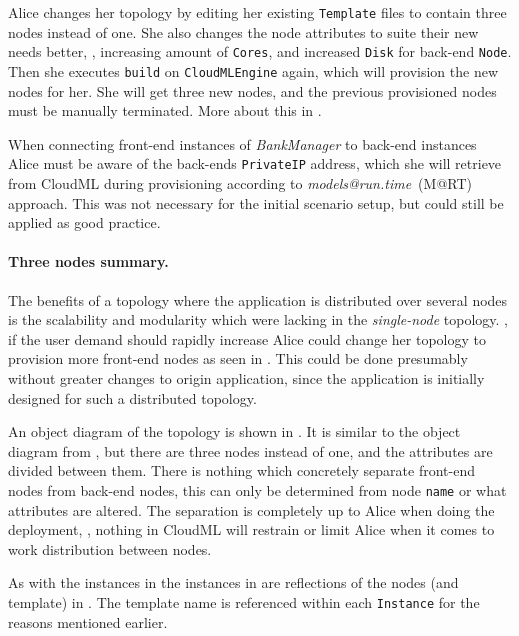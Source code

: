 Alice changes her topology by editing her existing \texttt{Template} files 
to contain three nodes instead of one. 
She also changes the node attributes to suite their new needs better,
\ie, increasing amount of \texttt{Cores}, and increased \texttt{Disk} for back-end \texttt{Node}.
Then she executes \texttt{build} on \texttt{CloudMLEngine} again,
which will provision the new nodes for her.
She will get three new nodes, and the previous provisioned nodes must be manually terminated.
More about this in .

When connecting front-end instances of \emph{BankManager} to back-end instances Alice must 
be aware of the back-ends \texttt{PrivateIP} address, which she will retrieve from CloudML
during provisioning according to \emph{models@run.time}~(M@RT) approach.
This was not necessary for the initial scenario setup, but could still be applied
as good practice.

\paragraph{Three nodes summary.}


The benefits of a topology where the application is distributed over several nodes 
is the scalability and modularity which were lacking in the \emph{single-node} topology.
\eg, if the user demand should rapidly increase Alice could change her topology to
provision more front-end nodes as seen in .
This could be done presumably without greater changes to origin application,
since the application is initially designed for such a distributed topology.

An object diagram of the topology is shown in .
It is similar to the object diagram from ,
but there are three nodes instead of one, and the attributes are divided between them.
There is nothing which concretely separate front-end nodes from back-end nodes,
this can only be determined from node \texttt{name} or what attributes are altered.
The separation is completely up to Alice when doing the deployment,
\ie, nothing in CloudML will restrain or limit Alice 
when it comes to work distribution between nodes.

As with the instances in  the instances in 
are reflections of the nodes (and template) in .
The template name is referenced within each \texttt{Instance} 
for the reasons mentioned earlier.

